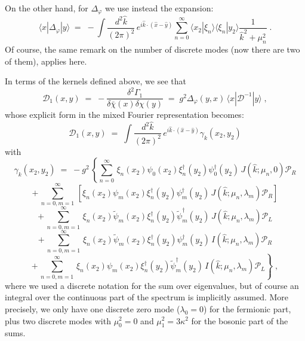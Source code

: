 \documentclass[a4paper,12pt]{article}
\begin{document}
On the other hand, for $\Delta_\varphi$ we use instead the expansion:
\begin{equation}
  \label{eq:bosexp}
\langle x|\Delta_\varphi|y\rangle \;=\; - \int \frac{d^2{\hat k}}{(2\pi)^2} \,
e^{i {\hat k}\cdot({\hat x}-{\hat y})}
\sum_{n=0}^\infty \langle x_2|\xi_n\rangle \langle\xi_n|y_2\rangle 
\frac{1}{{\hat k}^2 + \mu_n^2}\;.
\end{equation}
Of course, the same remark on the number of discrete modes
(now there are two of them), applies here.

In terms of the kernels defined above, we see that
\begin{equation}
 \label{eq:ddg1}
{\mathcal D}_1(x,y) \;=\; -
\frac{\delta^2 \Gamma_1}{\delta{\bar\chi}(x)\delta\chi(y)}\;=\; 
g^2 \Delta_\varphi(y,x) \, \langle x|{\mathcal D}^{-1}|y\rangle \;,  
\end{equation}
whose explicit form in the mixed Fourier representation becomes:
\begin{equation}
{\mathcal D}_1(x,y)\;=\;\int\frac{d^2{\hat k}}{(2\pi)^2} \,
e^{i {\hat k} \cdot ({\hat x} - {\hat y})} \gamma_k (x_2,y_2) 
\end{equation}
with
$$
\gamma_k (x_2,y_2) \;=\; - g^2 \, \left\{
 \sum_{n=0}^\infty \,
 \xi_n(x_2) \psi_0(x_2) \xi^\dagger_n(y_2) \psi^\dagger_0(y_2) \,
  J({\hat k};\mu_n,0) {\mathcal P}_R \right.
$$
$$
+\,\sum_{n=0,m=1}^\infty\,[\xi_n(x_2)\psi_m(x_2)\xi^\dagger_n(y_2) 
\psi^\dagger_m(y_2) \, J({\hat k};\mu_n,\lambda_m) {\mathcal P}_R ] 
$$
$$
+\,\sum_{n=0, m=1}^\infty \, \xi_n(x_2) {\tilde\psi}_m(x_2) \xi^\dagger_n(y_2) 
{\tilde\psi}^\dagger_m(y_2) \, J({\hat k};\mu_n,\lambda_m) {\mathcal P}_L  
$$
$$
+ \, \sum_{n=0, m=1}^\infty \, \xi_n(x_2) {\tilde\psi}_m(x_2) \xi^\dagger_n(y_2) 
\psi^\dagger_m(y_2) \, I({\hat k};\mu_n,\lambda_m) {\mathcal P}_R  
$$
\begin{equation}
  \label{eq:gammak}
\left. + \, \sum_{n=0, m=1}^\infty \, \xi_n(x_2) \psi_m(x_2) \xi^\dagger_n(y_2) 
{\tilde\psi}^\dagger_m(y_2) \, I({\hat k};\mu_n,\lambda_m) {\mathcal P}_L \right\} \;,
\end{equation}
where we used a discrete notation for the sum over eigenvalues, but
of course an integral over the continuous part of the spectrum is
implicitly assumed. More precisely, we only have one discrete zero 
mode ($\lambda_0 =0$) for the fermionic part, plus two discrete modes with
$\mu_0^2 = 0$ and $\mu_1^2 = 3 \kappa^2$ for the bosonic part of the sums. 
\end{document}
